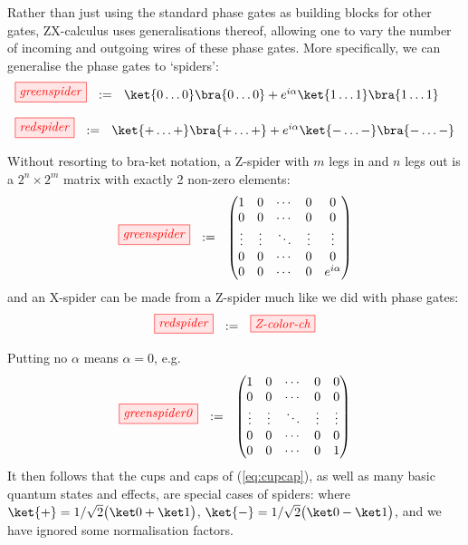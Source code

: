 \documentclass[11pt]{article}
\theoremstyle{definition}
\newcommand{\beq}{\begin{equation}}
\newcommand{\eeq}{\end{equation}\par\noindent}
\begin{document}
Rather than just using the standard phase gates as building blocks for other gates, ZX-calculus uses generalisations thereof,  allowing one to vary the number of incoming and outgoing wires of these phase gates.   More specifically, we can generalise the phase gates
to `spiders':   
\beq\label{eq:spiders}
\begin{array}{l}
\tikzfig{greenspider}\ \ :=\ \ \ket{0\ldots 0}\bra{0\ldots 0} + e^{i \alpha} \ket{1\ldots 1}\bra{1\ldots 1}
\vspace{4mm}\\
\tikzfig{redspider}\ \ :=\ \  \ket{+\ldots +}\bra{+\ldots +} + e^{i \alpha} \ket{-\ldots -}\bra{-\ldots -}
\end{array}  
\eeq
Without resorting to bra-ket notation, a Z-spider with $m$ legs in and $n$ legs out is a $2^n \times 2^m$ matrix with exactly 2 non-zero elements:
\[
\tikzfig{greenspider}\ \ :=\ \ 
\begin{pmatrix}
  1 & 0 & \cdots & 0 & 0 \\
  0 & 0 & \cdots & 0 & 0 \\
  \vdots & \vdots  & \ddots &  \vdots  &  \vdots  \\
  0 & 0 & \cdots & 0 & 0 \\
  0 & 0 & \cdots & 0 & e^{i\alpha} \\
\end{pmatrix}
\]
and an X-spider can be made from a Z-spider much like we did with phase gates:
\[
  \tikzfig{redspider} \ \ :=\ \ \tikzfig{Z-color-ch}
\]

Putting no $\alpha$ means $\alpha = 0$, e.g.  
\[
\tikzfig{greenspider0}\ \ :=\ \ 
\begin{pmatrix}
  1 & 0 & \cdots & 0 & 0 \\
  0 & 0 & \cdots & 0 & 0 \\
  \vdots & \vdots  & \ddots &  \vdots  &  \vdots  \\
  0 & 0 & \cdots & 0 & 0 \\
  0 & 0 & \cdots & 0 & 1 \\
\end{pmatrix}
\]
It then follows that the cups and caps of (\ref{eq:cupcap}), as well as many basic quantum states and effects, are special cases of spiders:
where $\ket{{+}} = 1/\sqrt{2} \big(\ket 0 + \ket 1\big)$, $\ket{{-}} = 1/\sqrt{2} \big(\ket 0 - \ket 1\big)$, and we have ignored some normalisation factors.
\end{document}
